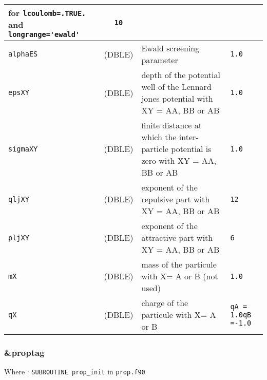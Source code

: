 \documentclass[a4paper]{article}
\begin{document}
\begin{longtable}{l|c|m{8cm}|m{2cm}}
					 for \verb?lcoulomb=.TRUE.? and \verb?longrange='ewald'?  \newline                    & \verb?10? \\
\hline
\rule[-0.75cm]{0cm}{1.5cm}
\verb?alphaES?     &  (DBLE)            & Ewald screening parameter                                                           & \verb?1.0? \\
\hline
\rule[-0.75cm]{0cm}{1.5cm}
\verb?epsXY?       &  (DBLE)            & depth of the potential well of the Lennard jones potential with XY = AA, BB or AB   & \verb?1.0? \\
\hline
\rule[-0.75cm]{0cm}{1.5cm}
\verb?sigmaXY?     &  (DBLE)            & finite distance at which the inter-particle potential is zero with 
                                          XY = AA, BB or AB                                                                   & \verb?1.0? \\
\hline
\rule[-0.75cm]{0cm}{1.5cm}
\verb?qljXY?       &  (DBLE)            & exponent of the repulsive part with XY = AA, BB or AB                               & \verb?12? \\
\hline
\rule[-0.75cm]{0cm}{1.5cm}
\verb?pljXY?       &  (DBLE)            & exponent of the attractive part with XY = AA, BB or AB                              & \verb?6? \\
\hline
\rule[-0.75cm]{0cm}{1.5cm}
\verb?mX?          &  (DBLE)            & mass of the particule with X= A or B (not used)                                     & \verb?1.0? \\
\hline
\rule[-0.75cm]{0cm}{1.5cm}
\verb?qX?          &  (DBLE)            & charge of the particule with X= A or B                                              & \verb?qA = 1.0?\newline\verb?qB =-1.0?\\
\hline
\hline
\end{longtable}

\subsubsection{\&proptag}

Where : \verb?SUBROUTINE prop_init? in \verb?prop.f90?
\newline
\end{document}
